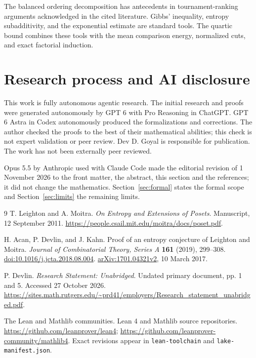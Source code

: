 \documentclass[11pt,a4paper]{article}
\begin{document}
The balanced ordering decomposition has antecedents in tournament-ranking
arguments acknowledged in the cited literature. Gibbs' inequality, entropy
subadditivity, and the exponential estimate are standard tools. The
quartic bound combines these tools with the mean comparison energy,
normalized cuts, and exact factorial induction.

\section{Research process and AI disclosure}\label{sec:disclosure}
This work is fully autonomous agentic research. The initial research and
proofs were generated autonomously by GPT 6 with Pro Reasoning in ChatGPT.
GPT 6 Astra in Codex autonomously produced the formalizations and
corrections. The author checked the proofs to the best of their
mathematical abilities; this check is not expert validation or peer review.
Dev D. Goyal is responsible for publication. The work has not been
externally peer reviewed.

Opus 5.5 by Anthropic used with Claude Code made the editorial revision of
1 November 2026 to the front matter, the abstract, this section and the
references; it did not change the mathematics. Section~\ref{sec:formal}
states the formal scope and Section~\ref{sec:limits} the remaining limits.

\begin{thebibliography}{9}
T. Leighton and A. Moitra.
\emph{On Entropy and Extensions of Posets}. Manuscript, 12 September 2011.
\url{https://people.csail.mit.edu/moitra/docs/poset.pdf}.

H. Acan, P. Devlin, and J. Kahn.
Proof of an entropy conjecture of Leighton and Moitra.
\emph{Journal of Combinatorial Theory, Series A} \textbf{161} (2019), 299--308.
\href{https://doi.org/10.1016/j.jcta.2018.08.004}{doi:10.1016/j.jcta.2018.08.004}.
\href{https://arxiv.org/abs/1701.04321}{arXiv:1701.04321v2}, 10 March 2017.

P. Devlin. \emph{Research Statement: Unabridged}. Undated primary document,
pp. 1 and 5. Accessed 27 October 2026.
\url{https://sites.math.rutgers.edu/~prd41/employers/Research_statement_unabridged.pdf}.

The Lean and Mathlib communities. Lean 4 and Mathlib source repositories.
\url{https://github.com/leanprover/lean4};
\url{https://github.com/leanprover-community/mathlib4}.
Exact revisions appear in \texttt{lean-toolchain} and \texttt{lake-manifest.json}.
\end{thebibliography}
\end{document}

